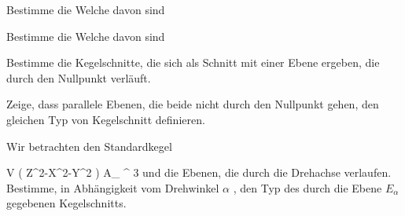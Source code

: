 \setcounter{section}{7}







{}
{





Bestimme die  Welche davon sind





}
{} {}

{}
{





Bestimme die  Welche davon sind





}
{} {}

{}
{





Bestimme die Kegelschnitte, die sich als Schnitt mit einer Ebene ergeben, die durch den Nullpunkt verläuft.





}
{} {}

{}
{





Zeige, dass parallele Ebenen, die beide nicht durch den Nullpunkt gehen, den gleichen Typ von Kegelschnitt definieren.





}
{} {}

{}
{





Wir betrachten den Standardkegel

\mavergleichskette
{\vergleichskette
{ V \left(  Z^2-X^2-Y^2  \right)
}
{ \subset }{ { {\mathbb A}_{  \R  }^{  3   } }
}
{  }{
}
{    }{
}
{   }{
}
}
{}{}{}
und die Ebenen, die durch die Drehachse
 verlaufen. Bestimme, in Abhängigkeit vom Drehwinkel $\alpha$
 {} {,}
den Typ des durch die Ebene $E_\alpha$ gegebenen Kegelschnitts.





}
{} {}

